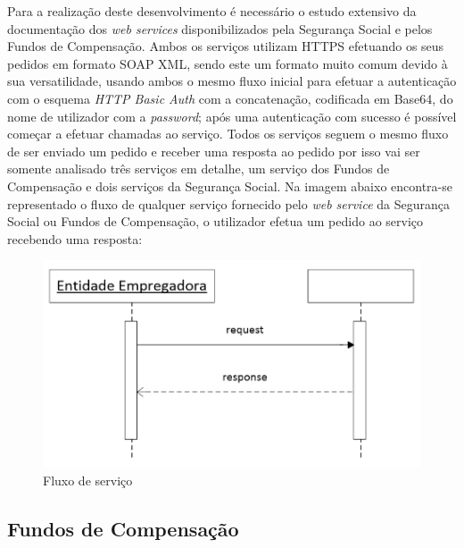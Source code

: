 \documentclass[sigplan]{acmart}
\begin{document}
Para a realização deste desenvolvimento é necessário o estudo extensivo da documentação dos \textit{web services} disponibilizados pela Segurança Social e pelos Fundos de Compensação. Ambos os serviços utilizam HTTPS efetuando os seus pedidos em formato SOAP XML, sendo este um formato muito comum devido à sua versatilidade, usando ambos o mesmo fluxo inicial para efetuar a autenticação com o esquema \textit{HTTP Basic Auth} com a concatenação, codificada em Base64, do nome de utilizador com a \textit{password}; após uma autenticação com sucesso é possível começar a efetuar chamadas ao serviço. Todos os serviços seguem o mesmo fluxo de ser enviado um pedido e receber uma resposta ao pedido por isso vai ser somente analisado três serviços em detalhe, um serviço dos Fundos de Compensação e dois serviços da Segurança Social. Na imagem abaixo encontra-se representado o fluxo de qualquer serviço fornecido pelo \textit{web service} da Segurança Social ou Fundos de Compensação, o utilizador efetua um pedido ao serviço recebendo uma resposta:
\FloatBarrier
\begin{figure}[htbp] %
	\centerline{\includegraphics[width=\linewidth]{figures/fluxo_servicos.png}}
	\caption{Fluxo de serviço}
	\label{fig3}
\end{figure}
\FloatBarrier

\subsection{Fundos de Compensação}
\end{document}
